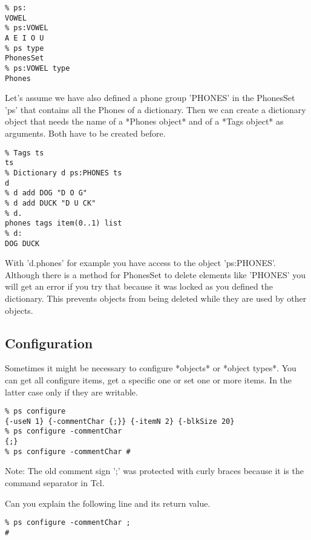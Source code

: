 \begin{verbatim}
% ps:
VOWEL
% ps:VOWEL
A E I O U
% ps type
PhonesSet
% ps:VOWEL type
Phones
\end{verbatim}

Let's assume we have also defined a phone group 'PHONES' in the
PhonesSet 'ps' that contains all the Phones of a dictionary. Then we can
create a dictionary object that needs the name of a *Phones object* and
of a *Tags object* as arguments. Both have to be created before.

\begin{verbatim}
% Tags ts
ts
% Dictionary d ps:PHONES ts
d
% d add DOG "D O G"
% d add DUCK "D U CK"
% d.
phones tags item(0..1) list
% d:
DOG DUCK
\end{verbatim}

With 'd.phones' for example you have access to the object 'ps:PHONES'.
Although there is a method for PhonesSet to delete elements like
'PHONES' you will get an error if you try that because it was locked as
you defined the dictionary. This prevents objects from being deleted
while they are used by other objects.

\subsection*{Configuration}

Sometimes it might be necessary to configure *objects* or *object
types*. You can get all configure items, get a specific one or set one
or more items. In the latter case only if they are writable.

\begin{verbatim}
% ps configure
{-useN 1} {-commentChar {;}} {-itemN 2} {-blkSize 20} 
% ps configure -commentChar
{;}
% ps configure -commentChar #
\end{verbatim}

Note: The old comment sign ';' was protected with curly braces {}
because it is the command separator in Tcl.

Can you explain the following line and its return value.

\begin{verbatim}
% ps configure -commentChar ;
#
\end{verbatim}

